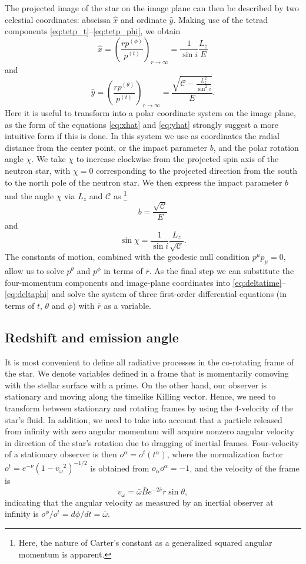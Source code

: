 \documentclass[iop, usenatbib]{emulateapj}
\newcommand{\be}{\begin{equation}}
\newcommand{\ee}{\end{equation}}
\newcommand{\Ca}{\ensuremath{\mathcal{C}}}
\newcommand{\rb}{\ensuremath{\bar{r}}}
\newcommand{\wb}{\ensuremath{\bar{\omega}}}
\newcommand{\nub}{\ensuremath{\bar{\nu}}}
\newcommand{\Bb}{\ensuremath{\bar{B}}}
\newcommand{\vw}{\ensuremath{v_{\omega}}}
\begin{document}
The projected image of the star on the image plane can then be described by two celestial coordinates:
abscissa $\hat{x}$ and ordinate $\hat{y}$.
Making use of the tetrad components \eqref{eq:tetp_t}--\eqref{eq:tetp_phi}, we obtain \citep[][p.347]{cha}
\be\label{eq:xhat}
\hat{x} = \left( \frac{rp^{(\phi)}}{p^{(t)}} \right)_{r \rightarrow \infty} = \frac{1}{\sin i} \frac{L_z}{E}
\ee
and
\be\label{eq:yhat}
\hat{y} = \left( \frac{rp^{(\theta)}}{p^{(t)}} \right)_{r \rightarrow \infty} = \frac{\sqrt{\Ca - \frac{L_z^2}{\sin^2 i}}}{E}.
\ee
Here it is useful to transform into a polar coordinate system on the image plane, as the form of the equations \eqref{eq:xhat} and \eqref{eq:yhat} strongly suggest a more intuitive form if this is done. 
In this system we use as coordinates the radial distance from the center point, or the impact parameter $b$, and the polar rotation angle $\chi$.  
We take $\chi$ to increase clockwise from the projected spin axis of the neutron star, with $\chi=0$ corresponding to the projected direction from the south to the north pole of the neutron star.  
We then express the impact parameter $b$ and the angle $\chi$ via $L_z$ and $\Ca$ as%
\footnote{
    Here, the nature of Carter's constant as a generalized squared
    angular momentum is apparent.
}
\be
b = \frac{\sqrt{\Ca}}{E}
\ee
and
\be
\sin \chi = \frac{1}{\sin i} \frac{L_z}{\sqrt{\Ca}}.
\ee
The constants of motion, combined with the geodesic null condition $p^\mu p_\mu = 0$, allow us to solve $p^\theta$ and $p^\phi$ in terms of $\rb$.
As the final step we can substitute the four-momentum components and image-plane coordinates into \eqref{eq:deltatime}--\eqref{eq:deltaphi} and solve the system of three first-order differential equations (in terms of $t$, $\theta$ and $\phi$) with $\rb$ as a variable.


\subsection{Redshift and emission angle}
It is most convenient to define all radiative processes in the co-rotating frame of the star.
We denote variables defined in a frame that is momentarily comoving with the stellar surface with a prime.  
On the other hand, our observer is stationary and moving along the timelike Killing vector.  
Hence, we need to transform between stationary and rotating frames by using the 4-velocity of the star's fluid.  
In addition, we need to take into account that a particle released from infinity with zero angular momentum will acquire nonzero angular velocity in direction of the star's rotation due to dragging of inertial frames.
Four-velocity of a stationary observer is then $o^{\alpha} = o^t(t^{\alpha})$, where the normalization factor $o^t = e^{-\nub}(1-\vw^2)^{-1/2}$ is obtained from $o_{\alpha}o^{\alpha} = -1$, and the velocity of the frame is 
\be
\vw = \wb \Bb e^{-2\nub} \rb \sin\theta,
\ee
indicating that the angular velocity as measured by an inertial observer at infinity is $o^{\phi} / o^{t} = d\phi/dt = \wb$.
\end{document}
